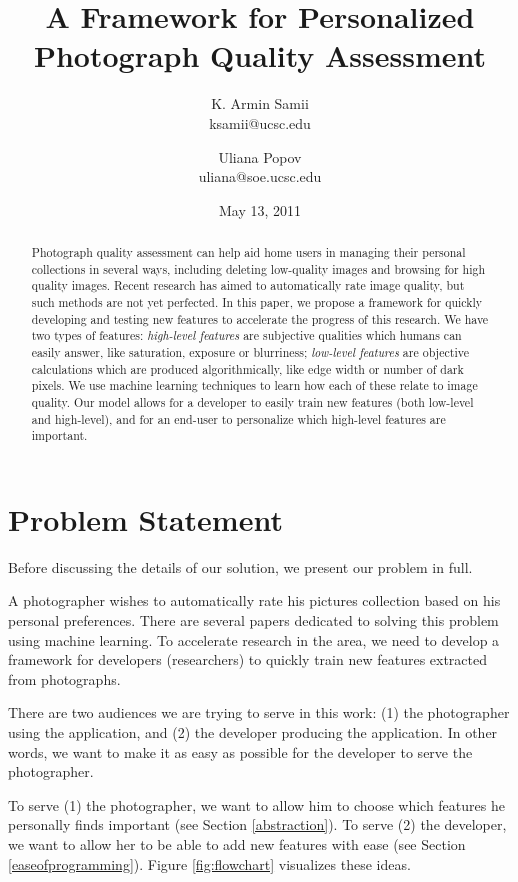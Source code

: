 \documentclass[11pt,letter]{article}
\title{A Framework for Personalized Photograph Quality Assessment}
\author{
K. Armin Samii \\
ksamii@ucsc.edu
\and
Uliana Popov \\
uliana@soe.ucsc.edu}
\date{May 13, 2011}
\begin{document}
\maketitle
\begin{abstract}
Photograph quality assessment can help aid home users in managing their personal collections in several ways, including deleting low-quality images and browsing for high quality images. Recent research has aimed to automatically rate image quality, but such methods are not yet perfected. In this paper, we propose a framework for quickly developing and testing new features to accelerate the progress of this research. We have two types of features: \textit{high-level features} are subjective qualities which humans can easily answer, like saturation, exposure or blurriness; \textit{low-level features} are objective calculations which are produced algorithmically, like edge width or number of dark pixels. We use machine learning techniques to learn how each of these relate to image quality. Our model allows for a developer to easily train new features (both low-level and high-level), and for an end-user to personalize which high-level features are important.

\end{abstract}

\section{Problem Statement}
Before discussing the details of our solution, we present our problem in full.

A photographer wishes to automatically rate his pictures collection based on his personal preferences. There are several papers dedicated to solving this problem using machine learning\cite{springerlink:10.1007/11744078_23}\cite{springerlink:10.1007/978-3-642-10543-2_23}\cite{Yeh:2010:PPR:1873951.1873963}. To accelerate research in the area, we need to develop a framework for developers (researchers) to quickly train new features extracted from photographs.

There are two audiences we are trying to serve in this work: (1) the photographer using the application, and (2) the developer producing the application. In other words, we want to make it as easy as possible for the developer to serve the photographer.

To serve (1) the photographer, we want to allow him to choose which features he personally finds important (see Section \ref{abstraction}). To serve (2) the developer, we want to allow her to be able to add new features with ease (see Section \ref{easeofprogramming}). Figure \ref{fig:flowchart} visualizes these ideas.
\end{document}
